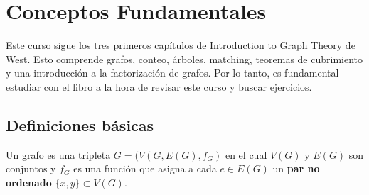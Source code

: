 \section{Conceptos Fundamentales}

Este curso sigue los tres primeros capítulos de Introduction to Graph Theory de West. Esto comprende grafos, conteo, árboles, matching, teoremas de cubrimiento y una introducción a la factorización de grafos. Por lo tanto, es fundamental estudiar con el libro a la hora de revisar este curso y buscar ejercicios.

\subsection{Definiciones básicas}

\begin{defn}
    Un \ul{grafo} es una tripleta $G = (V(G, E(G), f_G)$ en el cual $V(G)$ y $E(G)$ son conjuntos y $f_G$ es una función que asigna a cada $e \in E(G)$ un \textbf{par no ordenado} $\{x,y\} \subset V(G)$.
\end{defn}

